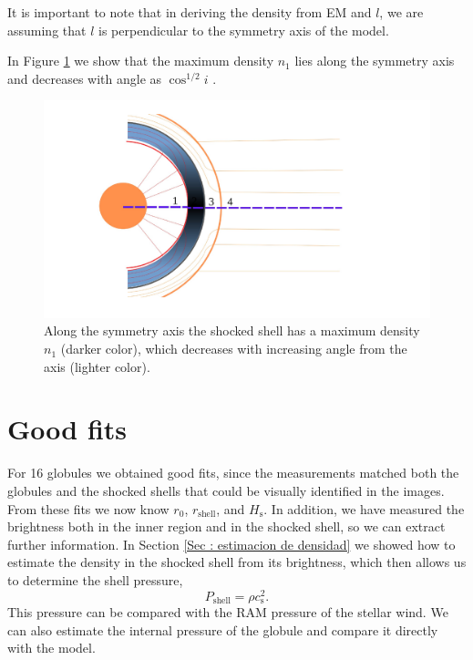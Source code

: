 \documentclass{book}
\begin{document}
It is important to note that in deriving the density from EM and $l$,
we are assuming that $l$ is perpendicular to the symmetry axis of the
model.

In Figure \ref{fig:dens_angl} we show that the maximum density $n_1$
lies along the symmetry axis and decreases with angle as
$\cos^{1/2} i$ \citep{Tarango:2018}.

\begin{figure}[htb]
  \centering
  \includegraphics[width=\textwidth]{Nuevas imagenes finales/densi_angle.pdf}
  \caption{Along the symmetry axis the shocked shell has a maximum
    density $n_1$ (darker color), which decreases with increasing
    angle from the axis (lighter color).}
  \label{fig:dens_angl}
\end{figure}
  
\section{Good fits}\label{Good results}

For 16 globules we obtained good fits, since the measurements matched
both the globules and the shocked shells that could be visually
identified in the images. From these fits we now know $r_0$,
$r_\mathrm{shell}$, and $H_\mathrm{s}$. In addition, we have measured
the brightness both in the inner region and in the shocked shell, so
we can extract further information. In Section \ref{Sec : estimacion
  de densidad} we showed how to estimate the density in the shocked
shell from its brightness, which then allows us to determine the shell
pressure,
\begin{equation}
    P_\mathrm{shell}=\rho c_\mathrm{s}^2.
\end{equation}
This pressure can be compared with the RAM pressure of the stellar
wind. We can also estimate the internal pressure of the globule and
compare it directly with the model.
\end{document}
